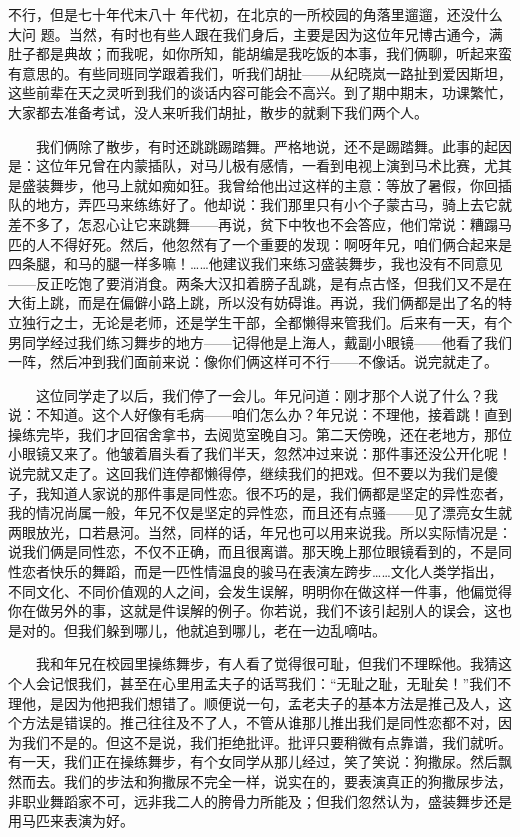 不行，但是七十年代末八十
年代初，在北京的一所校园的角落里遛遛，还没什么大问
题。当然，有时也有些人跟在我们身后，主要是因为这位年兄博古通今，满肚子都是典故；而我呢，如你所知，能胡编是我吃饭的本事，我们俩聊，听起来蛮有意思的。有些同班同学跟着我们，听我们胡扯——从纪晓岚一路扯到爱因斯坦，这些前辈在天之灵听到我们的谈话内容可能会不高兴。到了期中期末，功课繁忙，大家都去准备考试，没人来听我们胡扯，散步的就剩下我们两个人。

　　我们俩除了散步，有时还跳跳踢踏舞。严格地说，还不是踢踏舞。此事的起因是：这位年兄曾在内蒙插队，对马儿极有感情，一看到电视上演到马术比赛，尤其是盛装舞步，他马上就如痴如狂。我曾给他出过这样的主意：等放了暑假，你回插队的地方，弄匹马来练练好了。他却说：我们那里只有小个子蒙古马，骑上去它就差不多了，怎忍心让它来跳舞——再说，贫下中牧也不会答应，他们常说：糟蹋马匹的人不得好死。然后，他忽然有了一个重要的发现：啊呀年兄，咱们俩合起来是四条腿，和马的腿一样多嘛！……他建议我们来练习盛装舞步，我也没有不同意见——反正吃饱了要消消食。两条大汉扣着膀子乱跳，是有点古怪，但我们又不是在大街上跳，而是在偏僻小路上跳，所以没有妨碍谁。再说，我们俩都是出了名的特立独行之士，无论是老师，还是学生干部，全都懒得来管我们。后来有一天，有个男同学经过我们练习舞步的地方——记得他是上海人，戴副小眼镜——他看了我们一阵，然后冲到我们面前来说：像你们俩这样可不行——不像话。说完就走了。

　　这位同学走了以后，我们停了一会儿。年兄问道：刚才那个人说了什么？我说：不知道。这个人好像有毛病——咱们怎么办？年兄说：不理他，接着跳！直到操练完毕，我们才回宿舍拿书，去阅览室晚自习。第二天傍晚，还在老地方，那位小眼镜又来了。他皱着眉头看了我们半天，忽然冲过来说：那件事还没公开化呢！说完就又走了。这回我们连停都懒得停，继续我们的把戏。但不要以为我们是傻子，我知道人家说的那件事是同性恋。很不巧的是，我们俩都是坚定的异性恋者，我的情况尚属一般，年兄不仅是坚定的异性恋，而且还有点骚——见了漂亮女生就两眼放光，口若悬河。当然，同样的话，年兄也可以用来说我。所以实际情况是：说我们俩是同性恋，不仅不正确，而且很离谱。那天晚上那位眼镜看到的，不是同性恋者快乐的舞蹈，而是一匹性情温良的骏马在表演左跨步……文化人类学指出，不同文化、不同价值观的人之间，会发生误解，明明你在做这样一件事，他偏觉得你在做另外的事，这就是件误解的例子。你若说，我们不该引起别人的误会，这也是对的。但我们躲到哪儿，他就追到哪儿，老在一边乱嘀咕。

　　我和年兄在校园里操练舞步，有人看了觉得很可耻，但我们不理睬他。我猜这个人会记恨我们，甚至在心里用孟夫子的话骂我们：“无耻之耻，无耻矣！”我们不理他，是因为他把我们想错了。顺便说一句，孟老夫子的基本方法是推己及人，这个方法是错误的。推己往往及不了人，不管从谁那儿推出我们是同性恋都不对，因为我们不是的。但这不是说，我们拒绝批评。批评只要稍微有点靠谱，我们就听。有一天，我们正在操练舞步，有个女同学从那儿经过，笑了笑说：狗撒尿。然后飘然而去。我们的步法和狗撒尿不完全一样，说实在的，要表演真正的狗撒尿步法，非职业舞蹈家不可，远非我二人的胯骨力所能及；但我们忽然认为，盛装舞步还是用马匹来表演为好。

